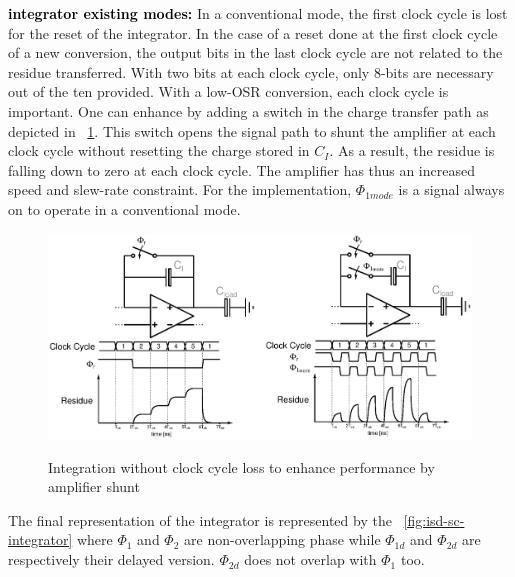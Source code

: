 \textbf{\textcolor{black}{integrator existing modes:}}
In a conventional mode, the first clock cycle is lost for the reset of the integrator. In the case of a reset done at the first clock cycle of a new conversion, the output bits in the last clock cycle are not related to the residue transferred. With two bits at each clock cycle, only 8-bits are necessary out of the ten provided. With a low-OSR conversion, each clock cycle is important. One can enhance by adding a switch in the charge transfer path as depicted in \figurename~\ref{fig:sigma-delta-modes-integration}. This switch opens the signal path to shunt the amplifier at each clock cycle without resetting the charge stored in $C_I$. As a result, the residue is falling down to zero at each clock cycle. The amplifier has thus an increased speed and slew-rate constraint. For the implementation, \(\Phi_{1mode} \) is a signal always on to operate in a conventional mode.

\begin{figure}[htp]
	\centering
	\includegraphics[width=\textwidth]{Chapter4/Figs/sigma-delta-modes-integration.ps}
	\begin{subfigure}[b]{0.48\textwidth}
		\centering
	\end{subfigure}
	\begin{subfigure}[b]{0.48\textwidth}
		\centering
	\end{subfigure}
	\caption{Integration without clock cycle loss to enhance performance by amplifier shunt}
	\label{fig:sigma-delta-modes-integration}
\end{figure}

The final representation of the integrator is represented by the \figurename~\ref{fig:isd-sc-integrator} where \(\Phi_1 \) and \(\Phi_2 \) are non-overlapping phase while \(\Phi_{1d} \) and \(\Phi_{2d} \) are respectively their delayed version. \(\Phi_{2d} \) does not overlap with \(\Phi_1 \) too.

